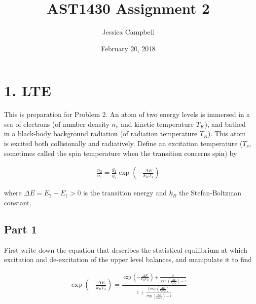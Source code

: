 \documentclass[12pt]{article}
\begin{document}
 
 
\title{AST1430 Assignment 2}
\author{Jessica Campbell}
\date{February 20, 2018}
\maketitle


\section*{1. LTE}

This is preparation for Problem 2. An atom of two energy levels is immersed in a sea of electrons (of number density $n_e$ and kinetic temperature $T_K$), and bathed in a black-body background radiation (of radiation temperature $T_R$). This atom is excited both collisionally and radiatively. Define an excitation temperature ($T_s$, sometimes called the spin temperature when the transition concerns spin) by

\begin{align*}
\frac{n_2}{n_1} = \frac{g_2}{g_1}\exp\left(-\frac{\Delta E}{k_BT_s}\right)
\end{align*}

where $\Delta E = E_2 - E_1 > 0$ is the transition energy and $k_B$ the Stefan-Boltzman constant.


\subsection*{Part 1}

First write down the equation that describes the statistical equilibrium at which excitation and de-excitation of the upper level balances, and manipulate it to find

\begin{equation*}
\begin{split}
\exp\left(-\frac{\Delta E}{k_BT_s}\right) = \frac{\exp\left(-\frac{\Delta E}{k_BT_K}\right) + \frac{\xi}{\exp\left(\frac{\Delta E}{k_BT_R}\right)-1}} {1+\frac{\xi\exp\left(\frac{\Delta E}{k_BT_R}\right)}{\exp\left(\frac{\Delta E}{k_BT_R}\right)-1}}
\end{split}
\end{equation*}
\end{document}
